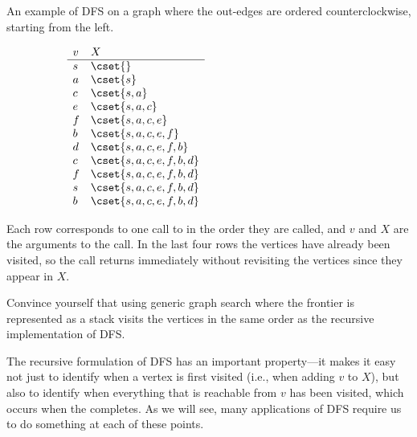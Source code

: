 \begin{example}
An example of DFS on a graph where the out-edges are ordered counterclockwise,
starting from the left.

\vspace{-.3in}
\begin{center}
~~~~~~~~~~
$\begin{array}{ll}
v & X  \\ \hline
s & \cset{}  \\
a & \cset{s}  \\
c & \cset{s,a}  \\
e & \cset{s,a,c}  \\
f & \cset{s,a,c,e}  \\
b & \cset{s,a,c,e,f}  \\
d & \cset{s,a,c,e,f,b}  \\
c & \cset{s,a,c,e,f,b,d}  \\
f & \cset{s,a,c,e,f,b,d}  \\
s & \cset{s,a,c,e,f,b,d}  \\
b & \cset{s,a,c,e,f,b,d}  \\
\end{array}
$
\end{center}
Each row corresponds to one call to  in
the order they are called, and $v$ and $X$ are the arguments to the
call.   In the last four rows the vertices have
already been visited, so the call returns immediately without
revisiting the vertices since they appear in $X$.
\end{example}

\begin{exercise}
Convince yourself that using generic graph search where the frontier
is represented as a stack visits the vertices in the same order as the
recursive implementation of DFS.
\end{exercise}

The recursive formulation of DFS has an important property---it makes
it easy not just to identify when a vertex is first visited (i.e.,
when adding $v$ to $X$), but also to identify when everything that is
reachable from $v$ has been visited, which occurs when the
 completes.
%
As we will see, many applications of DFS require us to do something at
each of these points.


